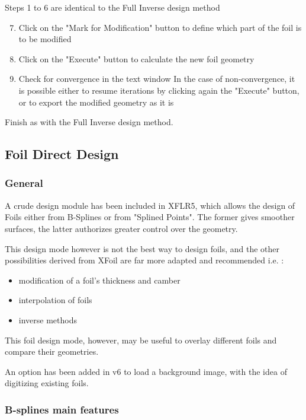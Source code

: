 \documentclass[a4paper,twoside,12pt,dvips]{article}
\begin{document}
Steps 1 to 6 are identical to the Full Inverse design method

\begin{enumerate}
\setcounter{enumi}{6}
\item Click on the "Mark for Modification" button to define which
part of the foil is to be modified
\item Click on the "Execute" button to calculate the new foil
geometry
\item Check for convergence in the text window\newline
In the case of non-convergence, it is possible either to resume
iterations by clicking again the "Execute" button, or to export the
modified geometry as it is
\end{enumerate}

Finish as with the Full Inverse design method.

\subsection{Foil Direct Design}

\subsubsection{General}

A crude design module has been included in XFLR5, which allows the
design of Foils either from B-Splines or from "Splined Points". The
former gives smoother surfaces, the latter authorizes greater control
over the geometry.

This design mode however is not the best way to design foils, and the
other possibilities derived from XFoil are far more adapted and
recommended i.e. :

\begin{itemize}
\item modification of a foil's thickness and camber
\item interpolation of foils
\item inverse methods
\end{itemize}

This foil design mode, however, may be useful to overlay different
foils and compare their geometries.

An option has been added in v6 to load a background image, with the
idea of digitizing existing foils.

\subsubsection{B-splines main features}
\end{document}
